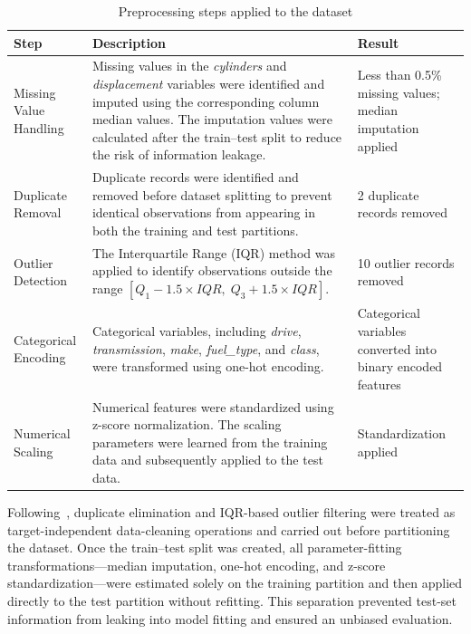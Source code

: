\begin{table}[H]
\centering
\renewcommand{\arraystretch}{1.3}
\begin{tabular}{|p{3.2cm}|p{6.5cm}|p{4.2cm}|}
\hline
\textbf{Step} & \textbf{Description} & \textbf{Result} \\
\hline

Missing Value Handling &
Missing values in the \textit{cylinders} and \textit{displacement} variables were identified and imputed using the corresponding column median values. The imputation values were calculated after the train--test split to reduce the risk of information leakage. &
Less than 0.5\% missing values; median imputation applied \\
\hline

Duplicate Removal &
Duplicate records were identified and removed before dataset splitting to prevent identical observations from appearing in both the training and test partitions. &
2 duplicate records removed \\
\hline

Outlier Detection &
The Interquartile Range (IQR) method was applied to identify observations outside the range $[Q_1 - 1.5 \times IQR,\; Q_3 + 1.5 \times IQR]$. &
10 outlier records removed \\
\hline

Categorical Encoding &
Categorical variables, including \textit{drive}, \textit{transmission}, \textit{make}, \textit{fuel\_type}, and \textit{class}, were transformed using one-hot encoding. &
Categorical variables converted into binary encoded features \\
\hline

Numerical Scaling &
Numerical features were standardized using z-score normalization. The scaling parameters were learned from the training data and subsequently applied to the test data. &
Standardization applied \\
\hline

\end{tabular}
\caption{Preprocessing steps applied to the dataset}
\label{tab:preprocessing_steps}
\end{table}

Following~\cite{atique2026explainable}, duplicate elimination and IQR-based outlier filtering were treated as target-independent data-cleaning operations and carried out before partitioning the dataset. Once the train--test split was created, all parameter-fitting transformations---median imputation, one-hot encoding, and z-score standardization---were estimated solely on the training partition and then applied directly to the test partition without refitting. This separation prevented test-set information from leaking into model fitting and ensured an unbiased evaluation.


